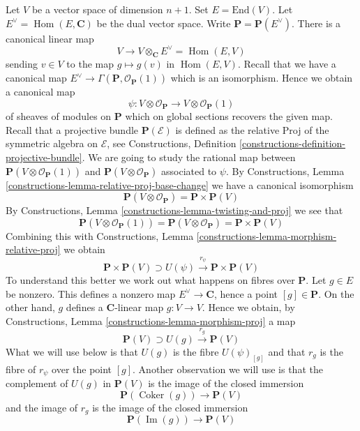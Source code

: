 \documentclass{stacks-project}
\theoremstyle{plain}
\theoremstyle{definition}
\theoremstyle{remark}
\numberwithin{equation}{subsection}
\def\Hom{\mathop{\mathrm{Hom}}\nolimits}
\def\Im{\mathop{\mathrm{Im}}}
\def\Coker{\mathop{\mathrm{Coker}}}
\begin{document}
\noindent
Let $V$ be a vector space of dimension $n + 1$. Set $E = \text{End}(V)$.
Let $E^\vee = \Hom(E, \mathbf{C})$ be the dual vector space.
Write $\mathbf{P} = \mathbf{P}(E^\vee)$.
There is a canonical linear map
$$
V \longrightarrow V \otimes_\mathbf{C} E^\vee = \Hom(E, V)
$$
sending $v \in V$ to the map $g \mapsto g(v)$ in $\Hom(E, V)$.
Recall that we have a canonical map
$E^\vee \to \Gamma(\mathbf{P}, \mathcal{O}_\mathbf{P}(1))$
which is an isomorphism. Hence we obtain a canonical map
$$
\psi : V \otimes \mathcal{O}_\mathbf{P} \to V \otimes \mathcal{O}_\mathbf{P}(1)
$$
of sheaves of modules on $\mathbf{P}$ which on global sections recovers
the given map. Recall that a projective bundle $\mathbf{P}(\mathcal{E})$
is defined as the relative Proj of the symmetric algebra on $\mathcal{E}$, see
Constructions, Definition \ref{constructions-definition-projective-bundle}.
We are going to study the rational
map between $\mathbf{P}(V \otimes \mathcal{O}_\mathbf{P}(1))$ and
$\mathbf{P}(V \otimes \mathcal{O}_\mathbf{P})$ associated to $\psi$. By
Constructions, Lemma \ref{constructions-lemma-relative-proj-base-change}
we have a canonical isomorphism
$$
\mathbf{P}(V \otimes \mathcal{O}_\mathbf{P}) = \mathbf{P} \times \mathbf{P}(V)
$$
By Constructions, Lemma \ref{constructions-lemma-twisting-and-proj}
we see that
$$
\mathbf{P}(V \otimes \mathcal{O}_\mathbf{P}(1)) =
\mathbf{P}(V \otimes \mathcal{O}_\mathbf{P}) = \mathbf{P} \times \mathbf{P}(V)
$$
Combining this with
Constructions, Lemma \ref{constructions-lemma-morphism-relative-proj}
we obtain
\begin{equation}
\label{equation-r-psi}
\mathbf{P} \times \mathbf{P}(V) \supset
U(\psi) \xrightarrow{r_\psi} \mathbf{P} \times \mathbf{P}(V)
\end{equation}
To understand this better we work out what happens on fibres over
$\mathbf{P}$. Let $g \in E$ be nonzero. This defines a nonzero map
$E^\vee \to \mathbf{C}$, hence a point $[g] \in \mathbf{P}$.
On the other hand, $g$ defines a $\mathbf{C}$-linear map $g : V \to V$.
Hence we obtain, by
Constructions, Lemma \ref{constructions-lemma-morphism-proj}
a map
$$
\mathbf{P}(V) \supset U(g) \xrightarrow{r_g} \mathbf{P}(V)
$$
What we will use below is that $U(g)$ is the fibre $U(\psi)_{[g]}$ and
that $r_g$ is the fibre of $r_\psi$ over the point $[g]$. Another observation
we will use is that the complement of $U(g)$ in $\mathbf{P}(V)$ is
the image of the closed immersion
$$
\mathbf{P}(\Coker(g)) \longrightarrow \mathbf{P}(V)
$$
and the image of $r_g$ is the image of the closed immersion
$$
\mathbf{P}(\Im(g)) \longrightarrow \mathbf{P}(V)
$$
\end{document}
